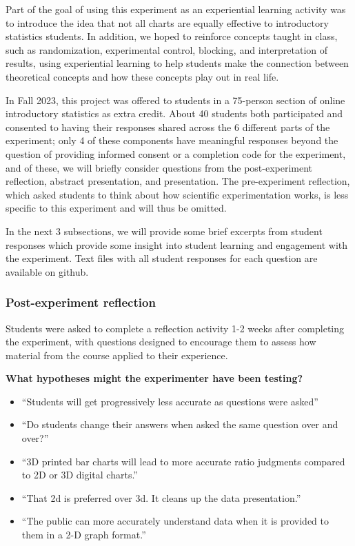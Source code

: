 \documentclass[runningheads
]{llncs}
\providecommand{\tightlist}{%
  \setlength{\itemsep}{0pt}\setlength{\parskip}{0pt}}\usepackage{longtable,booktabs,array}
\begin{document}
Part of the goal of using this experiment as an experiential learning
activity was to introduce the idea that not all charts are equally
effective to introductory statistics students. In addition, we hoped to
reinforce concepts taught in class, such as randomization, experimental
control, blocking, and interpretation of results, using experiential
learning to help students make the connection between theoretical
concepts and how these concepts play out in real life.

In Fall 2023, this project was offered to students in a 75-person
section of online introductory statistics as extra credit. About 40
students both participated and consented to having their responses
shared across the 6 different parts of the experiment; only 4 of these
components have meaningful responses beyond the question of providing
informed consent or a completion code for the experiment, and of these,
we will briefly consider questions from the post-experiment reflection,
abstract presentation, and presentation. The pre-experiment reflection,
which asked students to think about how scientific experimentation
works, is less specific to this experiment and will thus be omitted.

In the next 3 subsections, we will provide some brief excerpts from
student responses which provide some insight into student learning and
engagement with the experiment. Text files with all student responses
for each question are available on github.

\hypertarget{post-experiment-reflection}{%
\subsubsection{Post-experiment
reflection}\label{post-experiment-reflection}}

Students were asked to complete a reflection activity 1-2 weeks after
completing the experiment, with questions designed to encourage them to
assess how material from the course applied to their experience.

\textbf{What hypotheses might the experimenter have been testing?}

\begin{itemize}
\tightlist
\item
  ``Students will get progressively less accurate as questions were
  asked''
\item
  ``Do students change their answers when asked the same question over
  and over?''
\item
  ``3D printed bar charts will lead to more accurate ratio judgments
  compared to 2D or 3D digital charts.''
\item
  ``That 2d is preferred over 3d. It cleans up the data presentation.''
\item
  ``The public can more accurately understand data when it is provided
  to them in a 2-D graph format.''
\end{itemize}
\end{document}
